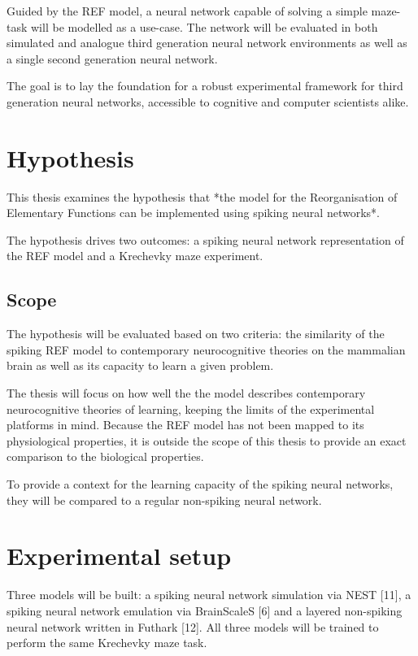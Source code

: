 \documentclass[report.tex]{subfiles}
\begin{document}
Guided by the REF model, a neural network capable of solving a simple
maze-task will be modelled as a use-case.
The network will be evaluated in both simulated and analogue
third generation neural network environments as well as a single second
generation neural network. 

The goal is to lay the foundation for a robust experimental framework
for third generation neural networks, accessible to cognitive and 
computer scientists alike.

\section{Hypothesis}
This thesis examines the hypothesis that *the model for the Reorganisation
of Elementary Functions can be implemented using spiking neural networks*.

The hypothesis drives two outcomes: a spiking neural network
representation of the REF model and a Krechevky maze experiment.

\subsection{Scope}
The hypothesis will be evaluated based on two criteria: the similarity of
the spiking REF model to contemporary neurocognitive theories on the
mammalian brain as well as its capacity to learn a given problem.

The thesis will focus on how well the the model describes contemporary
neurocognitive theories of learning, keeping the limits of the
experimental platforms in mind.
Because the REF model has not been mapped to its physiological
properties, it is outside the scope of this thesis to provide an exact
comparison to the biological properties.

To provide a context for the learning capacity of the spiking neural networks, they will be compared to a regular non-spiking neural network.

\section{Experimental setup}
Three models will be built: a spiking neural network simulation via NEST [11], a spiking neural network emulation via BrainScaleS [6] and a layered non-spiking neural network written in Futhark [12].
All three models will be trained to perform the same Krechevky maze task.
\end{document}
